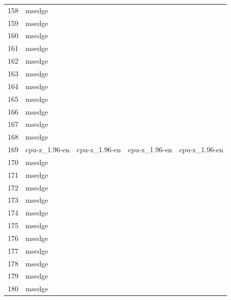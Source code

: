 \documentclass[a4paper,twoside,12pt]{book}
\begin{document}
\begin{appendices}
\begin{table}
\begin{tabular}{lllll}
	158 &         msedge &                &                &                \\
	159 &         msedge &                &                &                \\
	160 &         msedge &                &                &                \\
	161 &         msedge &                &                &                \\
	162 &         msedge &                &                &                \\
	163 &         msedge &                &                &                \\
	164 &         msedge &                &                &                \\
	165 &         msedge &                &                &                \\
	166 &         msedge &                &                &                \\
	167 &         msedge &                &                &                \\
	168 &         msedge &                &                &                \\
	169 &  cpu-z\_1.96-en &  cpu-z\_1.96-en &  cpu-z\_1.96-en &  cpu-z\_1.96-en \\
	170 &         msedge &                &                &                \\
	171 &         msedge &                &                &                \\
	172 &         msedge &                &                &                \\
	173 &         msedge &                &                &                \\
	174 &         msedge &                &                &                \\
	175 &         msedge &                &                &                \\
	176 &         msedge &                &                &                \\
	177 &         msedge &                &                &                \\
	178 &         msedge &                &                &                \\
	179 &         msedge &                &                &                \\
	180 &         msedge &                &                &                \\

\end{tabular}
\end{table}
\end{appendices}
\end{document}
